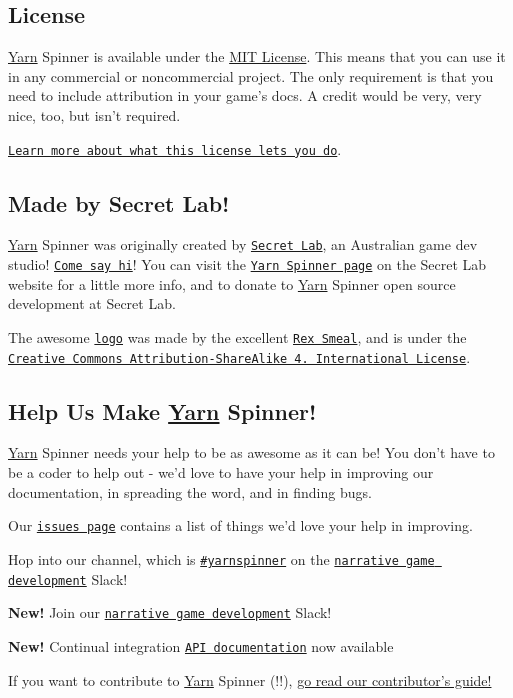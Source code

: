 \subsection*{License}

\hyperlink{a00040}{Yarn} Spinner is available under the \hyperlink{a00030}{M\-I\-T License}. This means that you can use it in any commercial or noncommercial project. The only requirement is that you need to include attribution in your game's docs. A credit would be very, very nice, too, but isn't required.


\begin{DoxyItemize}
\item \href{https://tldrlegal.com/license/mit-license}{\tt Learn more about what this license lets you do}.
\end{DoxyItemize}

\subsection*{Made by Secret Lab!}

\hyperlink{a00040}{Yarn} Spinner was originally created by \href{http://secretlab.com.au}{\tt Secret Lab}, an Australian game dev studio! \href{https://twitter.com/thesecretlab}{\tt Come say hi}! You can visit the \href{http://www.secretlab.com.au/yarnspinner}{\tt Yarn Spinner page} on the Secret Lab website for a little more info, and to donate to \hyperlink{a00040}{Yarn} Spinner open source development at Secret Lab.

The awesome \href{Documentation/YarnSpinnerLogo.png}{\tt logo} was made by the excellent \href{https://twitter.com/RexSmeal}{\tt Rex Smeal}, and is under the \href{http://creativecommons.org/licenses/by-sa/4.0/}{\tt Creative Commons Attribution-\/\-Share\-Alike 4. International License}.

\subsection*{Help Us Make \hyperlink{a00040}{Yarn} Spinner!}

\hyperlink{a00040}{Yarn} Spinner needs your help to be as awesome as it can be! You don't have to be a coder to help out -\/ we'd love to have your help in improving our documentation, in spreading the word, and in finding bugs.


\begin{DoxyItemize}
\item Our \href{https://github.com/thesecretlab/YarnSpinner/issues}{\tt issues page} contains a list of things we'd love your help in improving.
\item Hop into our channel, which is \href{http://narrativegamedev.slack.com/messages/yarnspinner}{\tt \#yarnspinner} on the \href{http://narrative-game-dev-slack.herokuapp.com}{\tt narrative game development} Slack!
\item {\bfseries New!} Join our \href{http://lab.to/narrativegamedev}{\tt narrative game development} Slack!
\item {\bfseries New!} Continual integration \href{https://thesecretlab.github.io/YarnSpinner/html/}{\tt A\-P\-I documentation} now available
\end{DoxyItemize}

If you want to contribute to \hyperlink{a00040}{Yarn} Spinner (!!), \hyperlink{a00002}{go read our contributor's guide!} 
